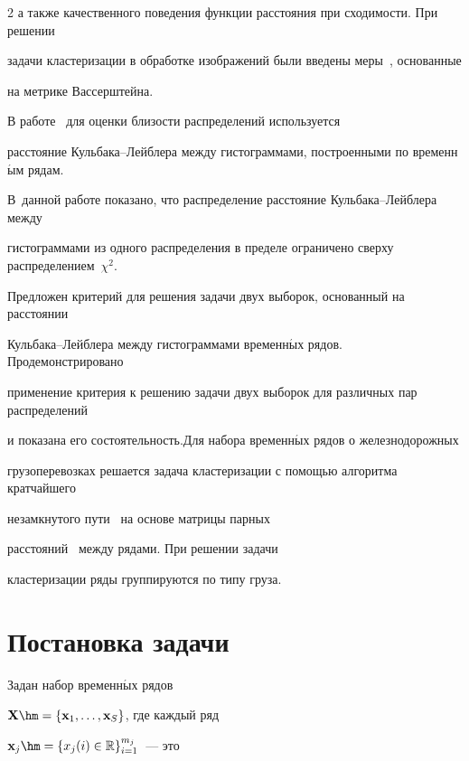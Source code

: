 \begin{multicols}{2}
а также качественного поведения функции рас\-сто\-яния при сходимости. При решении

задачи кластеризации в обработке изображений были введены меры~\cite{Mallows1972, Irpino}, основанные

на метрике Вассерштейна.



В работе~\cite{Medvednikova2012} для оценки близости распределений используется

расстояние Кульбака--Лейблера между гистограммами, построенными по временн$\acute{\mbox{ы}}$м рядам.

В~данной работе показано, что распределение расстояние Куль\-ба\-ка--Лейб\-ле\-ра между

гис\-то\-грам\-ма\-ми из одного распределения в пределе ограничено сверху распределением~$\chi^2$.



Предложен критерий для решения задачи двух выборок, основанный на расстоянии

Куль\-ба\-ка--Лейб\-ле\-ра между гистограммами временн$\acute{\mbox{ы}}$х рядов. Продемонстрировано

применение критерия к решению задачи двух выборок для различных пар распределений

и показана его состоятельность.\linebreak Для набора временн$\acute{\mbox{ы}}$х рядов о железнодорожных

грузоперевозках решается задача кластеризации с помощью алгоритма кратчайшего

незамкнутого пути~\cite{Dvoenko1999} на основе матрицы парных\linebreak

расстояний~\cite{StrijovRudakov, Dvoenko2013} между рядами. При решении задачи

кластеризации ряды группируются по типу груза.



\section{Постановка задачи}



Задан набор временн$\acute{\mbox{ы}}$х рядов

$\mathbf{X}\hm = \{\mathbf{x}_1, \dots, \mathbf{x}_S\}$, где каждый ряд

$\mathbf{x}_j \hm= \{x_j(i)\in\mathbb{R}\}_{i = 1}^{m_j}$~--- это


\end{multicols}
